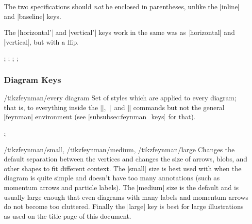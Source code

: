 \documentclass[a4paper,final]{ltxdoc}
\begin{document}
\begin{codeexample}[execute code=false]
\begin{keylist}
  The two  specifications should \emph{not} be enclosed in
  parentheses, unlike the |inline| and |baseline| keys.

  The |horizontal'| and |vertical'| keys work in the same was as |horizontal|
  and |vertical|, but with a flip.

\begin{codeexample}[]
;
;
;
;
\end{codeexample}
\end{keylist}

\subsubsection{Diagram Keys}
\label{subsubsec:diagram_keys}

\begin{stylekey}{/tikzfeynman/every diagram}
  Set of styles which are applied to every diagram; that is, to everything
  inside the |\feynmandiagram|, |\diagram| and |\diagram*| commands but not the
  general |{feynman}| environment (see \cref{subsubsec:feynman_keys} for that).

\begin{codeexample}[]
;
\end{codeexample}
\end{stylekey}

\begin{keylist}{%
    /tikzfeynman/small,
    /tikzfeynman/medium,
    /tikzfeynman/large}
  Changes the default separation between the vertices and changes the size of
  arrows, blobs, and other shapes to fit different context.  The |small| size is
  best used with when the diagram is quite simple and doesn't have too many
  annotations (such as momentum arrows and particle labels).  The |medium| size
  is the default and is usually large enough that even diagrams with many labels
  and momentum arrows do not become too cluttered.  Finally the |large| key is
  best for large illustrations as used on the title page of this document.


\end{keylist}
\end{codeexample}
\end{document}
